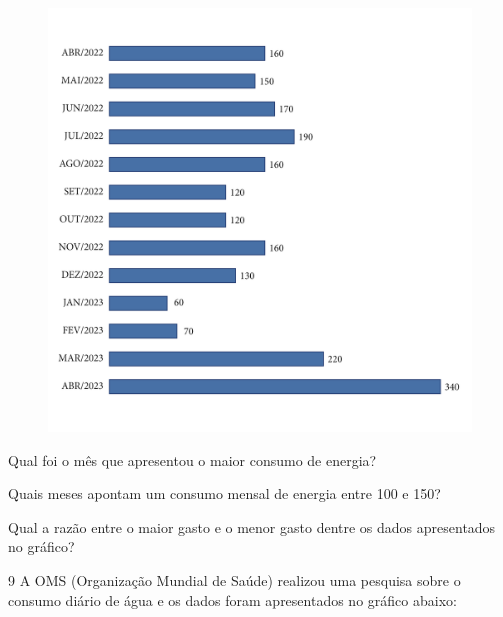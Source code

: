 \begin{figure}[htpb!]
\includegraphics[width=\textwidth]{../ilustracoes/MAT5/SAEB_5ANO_MAT_figura107.png}
\end{figure}

\begin{escolha}
\item
  Qual foi o mês que apresentou o maior consumo de energia?


\item
  Quais meses apontam um consumo mensal de energia entre 100 e 150?


\item
  Qual a razão entre o maior gasto e o menor gasto dentre os dados
  apresentados no gráfico?

\end{escolha}


\num{9} A OMS (Organização Mundial de Saúde) realizou uma pesquisa sobre o
consumo diário de água e os dados foram apresentados no gráfico abaixo:

